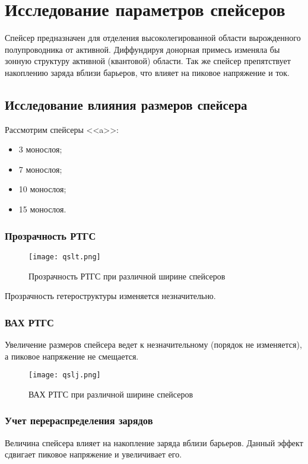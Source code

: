 \section{Исследование параметров спейсеров}
Спейсер предназначен для отделения высоколегированной области вырожденного полупроводника от активной. Диффундируя донорная примесь изменяла бы зонную структуру активной (квантовой) области. Так же спейсер препятствует накоплению заряда вблизи барьеров, что влияет на пиковое напряжение и ток.
\subsection{Исследование влияния размеров спейсера}
Рассмотрим спейсеры <<a>>: 
\begin{itemize}
	\item 3 монослоя;
	\item 7 монослоя;
	\item 10 монослоя;
	\item 15 монослоя.
\end{itemize}
\subsubsection{Прозрачность РТГС}

\begin{figure}[h]
	\centering
	\texttt{[image: qslt.png]}
	\caption{Прозрачность РТГС при различной ширине спейсеров}
	\label{fig:qslt}
\end{figure}

Прозрачность гетероструктуры изменяется незначительно.

\subsubsection{ВАХ РТГС}
Увеличение размеров спейсера ведет к незначительному (порядок не изменяется), а пиковое напряжение не смещается.

\begin{figure}[h!]
	\centering
	\texttt{[image: qslj.png]}
	\caption{ВАХ РТГС при различной ширине спейсеров}
	\label{fig:qslj}
\end{figure}


\subsubsection{Учет перераспределения зарядов}
Величина спейсера влияет на накопление заряда вблизи барьеров. Данный эффект сдвигает пиковое напряжение и увеличивает его.

